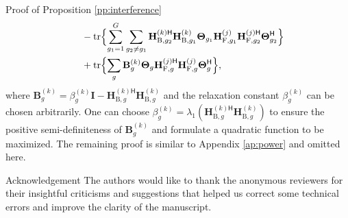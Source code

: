 \documentclass[journal]{IEEEtran}
\begin{document}
\begin{appendix}
\begin{subsection}{Proof of Proposition \ref{pp:interference}}
\begin{align*}
			& \quad - \operatorname{tr} \Bigl\{ \sum_{g_1=1}^G \sum_{g_2 \ne g_1} \mathbf{H}_{\mathrm{B},g_2}^{(k)\mathsf{H}} \mathbf{H}_{\mathrm{B},g_1}^{(k)} \mathbf{\Theta}_{g_1} \mathbf{H}_{\mathrm{F},g_1}^{(j)} \mathbf{H}_{\mathrm{F},g_2}^{(j)\mathsf{H}} \mathbf{\Theta}_{g_2}^\mathsf{H}\Bigr\} \\
			& \quad + \operatorname{tr} \Bigl\{ \sum_g \mathbf{B}_{g}^{(k)} \mathbf{\Theta}_{g} \mathbf{H}_{\mathrm{F},g}^{(j)\mathsf{H}} \mathbf{H}_{\mathrm{F},g}^{(j)} \mathbf{\Theta}_{g}^\mathsf{H} \Bigr\},
		\end{align*}
		where $\mathbf{B}_{g}^{(k)} = \beta_g^{(k)} \mathbf{I} - \mathbf{H}_{\mathrm{B},g}^{(k)\mathsf{H}} \mathbf{H}_{\mathrm{B},g}^{(k)}$ and the relaxation constant $\beta_g^{(k)}$ can be chosen arbitrarily.
		One can choose $\beta_g^{(k)} = \lambda_1(\mathbf{H}_{\mathrm{B},g}^{(k)\mathsf{H}} \mathbf{H}_{\mathrm{B},g}^{(k)})$ to ensure the positive semi-definiteness of $\mathbf{B}_{g}^{(k)}$ and formulate a quadratic function to be maximized.
		The remaining proof is similar to Appendix \ref{ap:power} and omitted here.
	\end{subsection}
\end{appendix}

\begin{section}{Acknowledgement}
	The authors would like to thank the anonymous reviewers for their insightful criticisms and suggestions that helped us correct some technical errors and improve the clarity of the manuscript.
\end{section}



\end{document}
